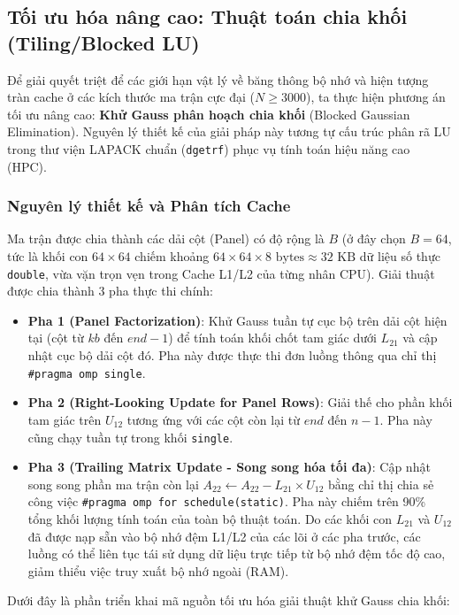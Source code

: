 \subsection{Tối ưu hóa nâng cao: Thuật toán chia khối (Tiling/Blocked LU)}
Để giải quyết triệt để các giới hạn vật lý về băng thông bộ nhớ và hiện tượng tràn cache ở các kích thước ma trận cực đại ($N \ge 3000$), ta thực hiện phương án tối ưu nâng cao: \textbf{Khử Gauss phân hoạch chia khối} (Blocked Gaussian Elimination). Nguyên lý thiết kế của giải pháp này tương tự cấu trúc phân rã LU trong thư viện LAPACK chuẩn (\texttt{dgetrf}) phục vụ tính toán hiệu năng cao (HPC).

\subsubsection{Nguyên lý thiết kế và Phân tích Cache}
Ma trận được chia thành các dải cột (Panel) có độ rộng là $B$ (ở đây chọn $B=64$, tức là khối con $64 \times 64$ chiếm khoảng $64 \times 64 \times 8 \text{ bytes} \approx 32\text{ KB}$ dữ liệu số thực \texttt{double}, vừa vặn trọn vẹn trong Cache L1/L2 của từng nhân CPU).
Giải thuật được chia thành 3 pha thực thi chính:
\begin{itemize}
    \item \textbf{Pha 1 (Panel Factorization)}: Khử Gauss tuần tự cục bộ trên dải cột hiện tại (cột từ $kb$ đến $end-1$) để tính toán khối chốt tam giác dưới $L_{21}$ và cập nhật cục bộ dải cột đó. Pha này được thực thi đơn luồng thông qua chỉ thị \texttt{\#pragma omp single}.
    \item \textbf{Pha 2 (Right-Looking Update for Panel Rows)}: Giải thế cho phần khối tam giác trên $U_{12}$ tương ứng với các cột còn lại từ $end$ đến $n-1$. Pha này cũng chạy tuần tự trong khối \texttt{single}.
    \item \textbf{Pha 3 (Trailing Matrix Update - Song song hóa tối đa)}: Cập nhật song song phần ma trận còn lại $A_{22} \leftarrow A_{22} - L_{21} \times U_{12}$ bằng chỉ thị chia sẻ công việc \texttt{\#pragma omp for schedule(static)}. Pha này chiếm trên 90\% tổng khối lượng tính toán của toàn bộ thuật toán. Do các khối con $L_{21}$ và $U_{12}$ đã được nạp sẵn vào bộ nhớ đệm L1/L2 của các lõi ở các pha trước, các luồng có thể liên tục tái sử dụng dữ liệu trực tiếp từ bộ nhớ đệm tốc độ cao, giảm thiểu việc truy xuất bộ nhớ ngoài (RAM).
\end{itemize}

Dưới đây là phần triển khai mã nguồn tối ưu hóa giải thuật khử Gauss chia khối:

